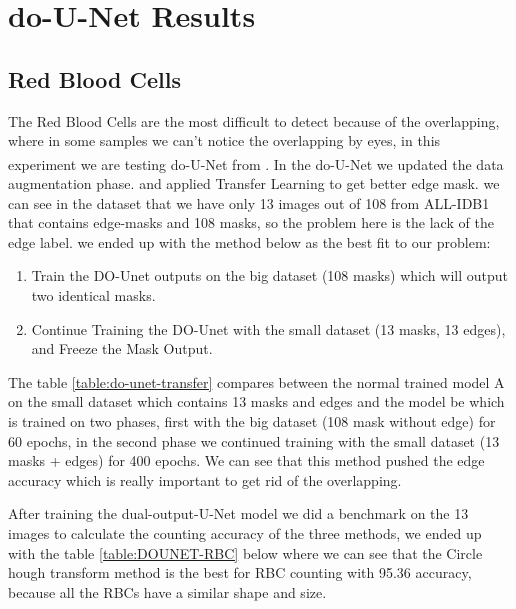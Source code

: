 \section{do-U-Net Results}
\subsection{Red Blood Cells}
\hspace{\parindent}
The Red Blood Cells are the most difficult to detect because of the overlapping, where in some samples we can't notice the overlapping by eyes, in this experiment we are testing do-U-Net from \textsuperscript{\cite{10.1007/978-3-030-44584-3_31}}.
In the do-U-Net we updated the data augmentation phase. and applied Transfer Learning to get better edge mask. we can see in the dataset that we have only 13 images out of 108 from ALL-IDB1 that contains edge-masks and 108 masks, so the problem here is the lack of the edge label. we ended up with the method below as the best fit to our problem:

\begin{enumerate}
    \item Train the DO-Unet outputs on the big dataset (108 masks) which will output two identical masks.
    \item Continue Training the DO-Unet with the small dataset (13 masks, 13 edges), and Freeze the Mask Output.
\end{enumerate}



The table \ref{table:do-unet-transfer} compares between the normal trained model A on the small dataset which contains 13 masks and edges and the model be which is trained on two phases, first with the big dataset (108 mask without edge) for 60 epochs, in the second phase we continued training with the small dataset (13 masks + edges) for 400 epochs.
We can see that this method pushed the edge accuracy which is really important to get rid of the overlapping.

After training the dual-output-U-Net model we did a benchmark on the 13 images to calculate the counting accuracy of the three methods, we ended up with the table \ref{table:DOUNET-RBC} below where we can see that the Circle hough transform method is the best for RBC counting with 95.36 accuracy, because all the RBCs have a similar shape and size.



